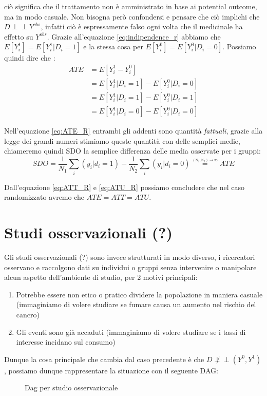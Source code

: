 ciò significa che il trattamento non è amministrato in base ai potential outcome, ma in modo casuale. Non bisogna però confondersi e pensare che ciò implichi che $D \perp\!\!\!\perp Y^{obs}$, infatti ciò è espressamente falso ogni volta che il medicinale ha effetto su $Y^{obs}$.
Grazie all'equazione \ref{eq:indipendence_r} abbiamo che $E[Y^1_i] = E[Y^{1}_i | D_i = 1]  $ e la stessa cosa per $E[Y^0_i] = E[Y^{0}_i | D_i = 0] $.
Possiamo quindi dire che :
\begin{align}
ATE &= E[Y^1_i-Y^0_i ] \\ 
 &= E[Y^{1}_i | D_i = 1]- E[Y^{0}_i | D_i = 0]\label{eq:ATE_R} \\
	& =E[Y^{1}_i | D_i = 1]- E[Y^{0}_i | D_i = 1] \label{eq:ATT_R} \\
 &= E[Y^{1}_i | D_i = 0]- E[Y^{0}_i | D_i = 0] \label{eq:ATU_R}
  \end{align}

Nell'equazione \ref{eq:ATE_R} entrambi gli addenti sono quantità \textit{fattuali}, grazie alla legge dei grandi numeri stimiamo queste quantità con delle semplici medie, chiameremo quindi SDO la semplice differenza delle media osservate per i gruppi:
$$SDO = \frac{1}{N_1}\sum_i(y_i|d_i=1) - \frac{1}{N_2}\sum_i(y_i|d_i=0) \overset{\underset{\mathrm{(N_1, N_2) \rightarrow \infty}}{}}{=} ATE$$

Dall'equazione \ref{eq:ATT_R} e \ref{eq:ATU_R} possiamo concludere che nel caso randomizzato avremo che $ATE = ATT = ATU$.


\section{Studi osservazionali (?)} %
Gli studi osservazionali (?) sono invece strutturati in modo diverso, i ricercatori osservano e raccolgono dati su individui o gruppi senza intervenire o manipolare alcun aspetto dell'ambiente di studio, per 2 motivi principali:
\begin{enumerate}
\item Potrebbe essere non etico o pratico dividere la popolazione in maniera casuale (immaginiamo di volere studiare se fumare causa un aumento nel rischio del cancro)
\item Gli eventi sono già accaduti (immaginiamo di volere studiare se i tassi di interesse incidano sul consumo)
\end{enumerate}

Dunque la cosa principale che cambia dal caso precedente è che $D \not \perp\!\!\!\perp (Y^{0},Y^{1})$, possiamo dunque rappresentare la situazione con il seguente DAG:
\begin{figure}[!h]
\centering
\caption{Dag per studio osservazionale}
\label{fig:dag_OBS}
\end{figure}